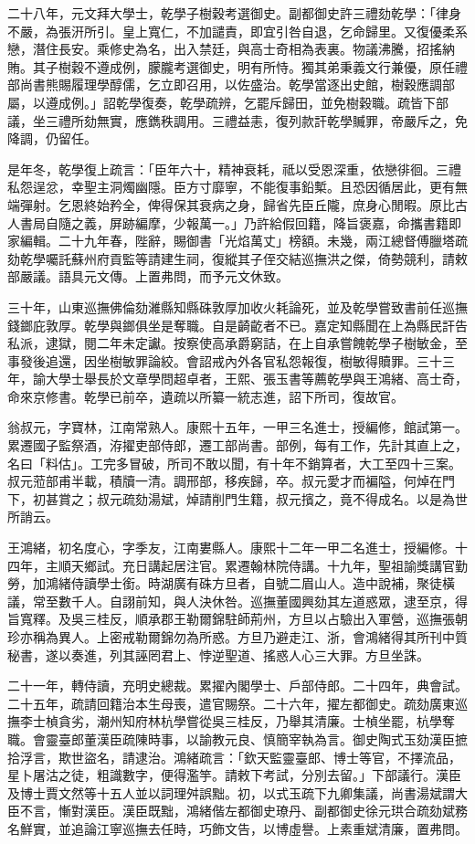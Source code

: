 \begin{pinyinscope}
二十八年，元文拜大學士，乾學子樹穀考選御史。副都御史許三禮劾乾學：「律身不嚴，為張汧所引。皇上寬仁，不加譴責，即宜引咎自退，乞命歸里。又復優柔系戀，潛住長安。乘修史為名，出入禁廷，與高士奇相為表裏。物議沸騰，招搖納賄。其子樹穀不遵成例，朦朧考選御史，明有所恃。獨其弟秉義文行兼優，原任禮部尚書熊賜履理學醇儒，乞立即召用，以佐盛治。乾學當逐出史館，樹穀應調部屬，以遵成例。」詔乾學復奏，乾學疏辨，乞罷斥歸田，並免樹穀職。疏皆下部議，坐三禮所劾無實，應鐫秩調用。三禮益恚，復列款訐乾學贓罪，帝嚴斥之，免降調，仍留任。

是年冬，乾學復上疏言：「臣年六十，精神衰耗，祗以受恩深重，依戀徘徊。三禮私怨逞忿，幸聖主洞燭幽隱。臣方寸靡寧，不能復事鉛槧。且恐因循居此，更有無端彈射。乞恩終始矜全，俾得保其衰病之身，歸省先臣丘隴，庶身心閒暇。原比古人書局自隨之義，屏跡編摩，少報萬一。」乃許給假回籍，降旨褒嘉，命攜書籍即家編輯。二十九年春，陛辭，賜御書「光焰萬丈」榜額。未幾，兩江總督傅臘塔疏劾乾學囑託蘇州府貢監等請建生祠，復縱其子侄交結巡撫洪之傑，倚勢競利，請敕部嚴議。語具元文傳。上置弗問，而予元文休致。

三十年，山東巡撫佛倫劾濰縣知縣硃敦厚加收火耗論死，並及乾學嘗致書前任巡撫錢鎯庇敦厚。乾學與鎯俱坐是奪職。自是齮齕者不已。嘉定知縣聞在上為縣民訐告私派，逮獄，閱二年未定讞。按察使高承爵窮詰，在上自承嘗餽乾學子樹敏金，至事發後追還，因坐樹敏罪論絞。會詔戒內外各官私怨報復，樹敏得贖罪。三十三年，諭大學士舉長於文章學問超卓者，王熙、張玉書等薦乾學與王鴻緒、高士奇，命來京修書。乾學已前卒，遺疏以所纂一統志進，詔下所司，復故官。

翁叔元，字寶林，江南常熟人。康熙十五年，一甲三名進士，授編修，館試第一。累遷國子監祭酒，洊擢吏部侍郎，遷工部尚書。部例，每有工作，先計其直上之，名曰「料估」。工完多冒破，所司不敢以聞，有十年不銷算者，大工至四十三案。叔元蒞部甫半載，積牘一清。調邢部，移疾歸，卒。叔元愛才而褊隘，何焯在門下，初甚賞之；叔元疏劾湯斌，焯請削門生籍，叔元擯之，竟不得成名。以是為世所誚云。

王鴻緒，初名度心，字季友，江南婁縣人。康熙十二年一甲二名進士，授編修。十四年，主順天鄉試。充日講起居注官。累遷翰林院侍講。十九年，聖祖諭獎講官勤勞，加鴻緒侍讀學士銜。時湖廣有硃方旦者，自號二眉山人。造中說補，聚徒橫議，常至數千人。自詡前知，與人決休咎。巡撫董國興劾其左道惑眾，逮至京，得旨寬釋。及吳三桂反，順承郡王勒爾錦駐師荊州，方旦以占驗出入軍營，巡撫張朝珍亦稱為異人。上密戒勒爾錦勿為所惑。方旦乃避走江、浙，會鴻緒得其所刊中質秘書，遂以奏進，列其誣罔君上、悖逆聖道、搖惑人心三大罪。方旦坐誅。

二十一年，轉侍讀，充明史總裁。累擢內閣學士、戶部侍郎。二十四年，典會試。二十五年，疏請回籍治本生母喪，遣官賜祭。二十六年，擢左都御史。疏劾廣東巡撫李士楨貪劣，潮州知府林杭學嘗從吳三桂反，乃舉其清廉。士楨坐罷，杭學奪職。會靈臺郎董漢臣疏陳時事，以諭教元良、慎簡宰執為言。御史陶式玉劾漢臣摭拾浮言，欺世盜名，請逮治。鴻緒疏言：「欽天監靈臺郎、博士等官，不擇流品，星卜屠沽之徒，粗識數字，便得濫竽。請敕下考試，分別去留。」下部議行。漢臣及博士賈文然等十五人並以詞理舛誤黜。初，以式玉疏下九卿集議，尚書湯斌謂大臣不言，慚對漢臣。漢臣既黜，鴻緒偕左都御史璙丹、副都御史徐元珙合疏劾斌務名鮮實，並追論江寧巡撫去任時，巧飾文告，以博虛譽。上素重斌清廉，置弗問。


\end{pinyinscope}
